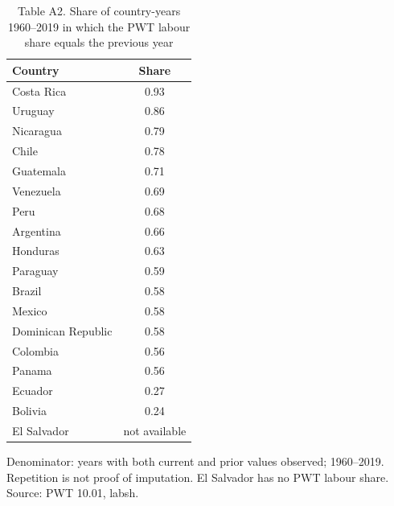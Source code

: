 \begin{table}[htbp]\centering
\caption{Table A2. Share of country-years 1960--2019 in which the PWT labour share equals the previous year}
\label{tab:pwtimp}
\small
\begin{tabular}{lc}
\toprule
Country & Share \\
\midrule
Costa Rica & 0.93 \\
Uruguay & 0.86 \\
Nicaragua & 0.79 \\
Chile & 0.78 \\
Guatemala & 0.71 \\
Venezuela & 0.69 \\
Peru & 0.68 \\
Argentina & 0.66 \\
Honduras & 0.63 \\
Paraguay & 0.59 \\
Brazil & 0.58 \\
Mexico & 0.58 \\
Dominican Republic & 0.58 \\
Colombia & 0.56 \\
Panama & 0.56 \\
Ecuador & 0.27 \\
Bolivia & 0.24 \\
El Salvador & not available \\
\bottomrule
\end{tabular}
\begin{tablenotes}\footnotesize Denominator: years with both current and prior values observed; 1960--2019. Repetition is not proof of imputation. El Salvador has no PWT labour share. Source: PWT 10.01, labsh.\end{tablenotes}
\end{table}